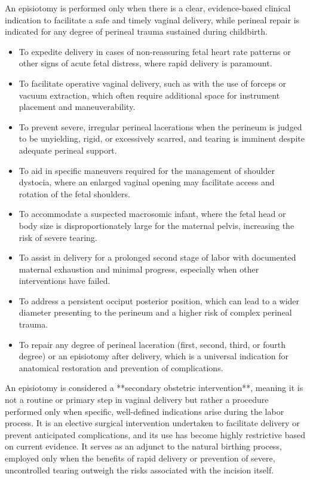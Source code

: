 An episiotomy is performed only when there is a clear, evidence-based clinical indication to facilitate a safe and timely vaginal delivery, while perineal repair is indicated for any degree of perineal trauma sustained during childbirth.

\begin{itemize}
  \item To expedite delivery in cases of non-reassuring fetal heart rate patterns or other signs of acute fetal distress, where rapid delivery is paramount.
  \item To facilitate operative vaginal delivery, such as with the use of forceps or vacuum extraction, which often require additional space for instrument placement and maneuverability.
  \item To prevent severe, irregular perineal lacerations when the perineum is judged to be unyielding, rigid, or excessively scarred, and tearing is imminent despite adequate perineal support.
  \item To aid in specific maneuvers required for the management of shoulder dystocia, where an enlarged vaginal opening may facilitate access and rotation of the fetal shoulders.
  \item To accommodate a suspected macrosomic infant, where the fetal head or body size is disproportionately large for the maternal pelvis, increasing the risk of severe tearing.
  \item To assist in delivery for a prolonged second stage of labor with documented maternal exhaustion and minimal progress, especially when other interventions have failed.
  \item To address a persistent occiput posterior position, which can lead to a wider diameter presenting to the perineum and a higher risk of complex perineal trauma.
  \item To repair any degree of perineal laceration (first, second, third, or fourth degree) or an episiotomy after delivery, which is a universal indication for anatomical restoration and prevention of complications.
\end{itemize}

An episiotomy is considered a **secondary obstetric intervention**, meaning it is not a routine or primary step in vaginal delivery but rather a procedure performed only when specific, well-defined indications arise during the labor process. It is an elective surgical intervention undertaken to facilitate delivery or prevent anticipated complications, and its use has become highly restrictive based on current evidence. It serves as an adjunct to the natural birthing process, employed only when the benefits of rapid delivery or prevention of severe, uncontrolled tearing outweigh the risks associated with the incision itself.

